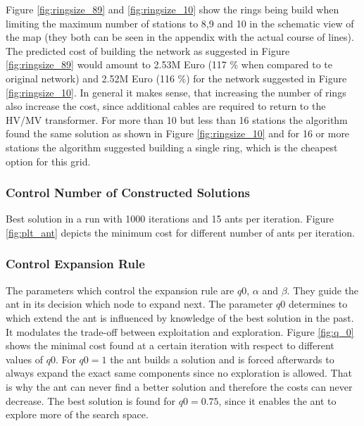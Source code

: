 
Figure \ref{fig:ringsize_89} and \ref{fig:ringsize_10} show the rings being build when limiting the maximum number of stations to 8,9 and 10 in the schematic view of the map (they both can be seen in the appendix with the actual course of lines). The predicted cost of building the network as suggested in Figure \ref{fig:ringsize_89} would amount to 2.53M Euro (117 \% when compared to te original network) and 2.52M Euro (116 \%) for the network suggested in Figure \ref{fig:ringsize_10}. In general it makes sense, that increasing the number of rings also increase the cost, since additional cables are required to return to the HV/MV transformer. For more than 10 but less than 16 stations the algorithm found the same solution as shown in Figure \ref{fig:ringsize_10} and for 16 or more stations the algorithm suggested building a single ring, which is the cheapest option for this grid.

%
%
%
%

\subsubsection{Control Number of Constructed Solutions}\label{constructed_solutions}

Best solution in a run with 1000 iterations and 15 ants per iteration.
Figure \ref{fig:plt_ant} depicts the minimum cost for different number of ants per iteration.


\subsubsection{Control Expansion Rule}\label{expansion_rule}
The parameters which control the expansion rule are $q0$, $\alpha$ and $\beta$. They guide the ant in its decision which node to expand next. The parameter $q0$ determines to which extend the ant is influenced by knowledge of the best solution in the past. It modulates the trade-off between exploitation and exploration. Figure \ref{fig:q_0} shows the minimal cost found at a certain iteration with respect to different values of $q0$. For $q0 = 1$ the ant builds a solution and is forced afterwards to always expand the exact same components since no exploration is allowed. That is why the ant can never find a better solution and therefore the costs can never decrease. The best solution is found for $q0 = 0.75$, since it enables the ant to explore more of the search space.

